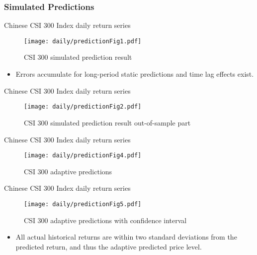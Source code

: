 \subsubsection{Simulated Predictions}

\begin{frame}[fragile,t]{Chinese CSI 300 Index daily return series}
	\begin{figure}[!hbt]
    \center
    \texttt{[image: daily/predictionFig1.pdf]}
    \caption{CSI 300 simulated prediction result}
    \label{fig:CSI:predictionall}
    \end{figure}

    \begin{itemize}
	\item Errors accumulate for long-period static predictions and time lag effects exist.
	\end{itemize}   
\end{frame}

\begin{frame}[fragile]{Chinese CSI 300 Index daily return series}
	\begin{figure}[!hbt]
    \center
    \texttt{[image: daily/predictionFig2.pdf]}
    \caption{CSI 300 simulated prediction result out-of-sample part}
    \label{fig:CSI:predictionout}
    \end{figure}
\end{frame}

\begin{frame}[fragile]{Chinese CSI 300 Index daily return series}
	\begin{figure}[!hbt]
    \center
    \texttt{[image: daily/predictionFig4.pdf]}
    \caption{CSI 300 adaptive predictions}
    \label{fig:CSI:adaptive}
    \end{figure}
\end{frame}

\begin{frame}[fragile,t]{Chinese CSI 300 Index daily return series}
	\begin{figure}[!hbt]
    \center
    \texttt{[image: daily/predictionFig5.pdf]}
    \caption{CSI 300 adaptive predictions with confidence interval}
    \label{fig:CSI:adaptiveconfi}
    \end{figure}

    \begin{itemize}
	\item All actual historical returns are within two standard deviations from the predicted return,
		and thus the adaptive predicted price level.
	\end{itemize}   
\end{frame}

